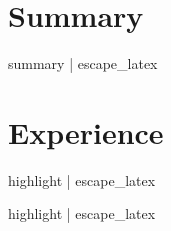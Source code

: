 \documentclass[10pt]{resume}
\begin{document}

{%
\vspace{0.5em}
{%
{%

\section{Summary}

{{ summary | escape_latex }}

\section{Experience}

{%
{%
{%
{%
{%
{%
\expblock
{%
{
{%
    \item {{ highlight | escape_latex }}
{%
}
{%

{%
{%
{%
{%
{%
{%
\expblock
{%
{
{%
    \item {{ highlight | escape_latex }}
{%
}
{%

}}}}}}}}}}}}}}}}}}}}}}}
\end{document}
